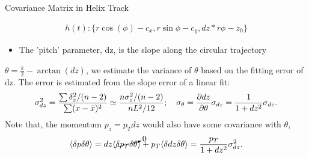 \documentclass[
	xcolor=dvipsnames,
	aspectratio=169,	
	10pt, 
	]{beamer}
\begin{document}
\begin{frame}{Covariance Matrix in Helix Track}
	\begin{block}{}
		{
			\begin{align}
				h(t): \{r\cos(\phi ) - c_x , r\sin\phi - c_y,  dz*r\phi - z_0\}\label{EqHelix}
			\end{align}
			\begin{itemize}
				\item The 'pitch' parameter, dz, is the slope along the circular trajectory
			\end{itemize}
		}
		\vspace{3 mm}
		$\theta = \frac{\pi}{2}-\arctan(dz)$, we estimate the variance of $\theta$ based on the fitting error of dz. The error is estimated from the slope error of a linear fit: 
		\begin{align*}
			\sigma_{dz}^2 =\frac{\sum\delta_z^2/(n-2) }{\sum(x-\bar x)^2} \simeq \frac{n \sigma_z^2/(n-2)}{n L^2/12};\quad \sigma_\theta = \frac{\partial dz}{\partial \theta}\sigma_{dz}=\frac{1}{1+dz^2}\sigma_{dz}.
		\end{align*}
		Note that, the momentum $p_z=p_T dz$ would also have some covariance with $\theta$,
		\begin{align*}
			\langle \delta p\delta \theta\rangle = dz\langle  \cancelto{0}{\delta p_T  \delta \theta}\rangle+	p_T\langle \delta dz \delta \theta\rangle =\frac{p_T}{1+dz^2}\sigma_{dz}^2.
		\end{align*}
	\end{block}
\end{frame}
\end{document}
